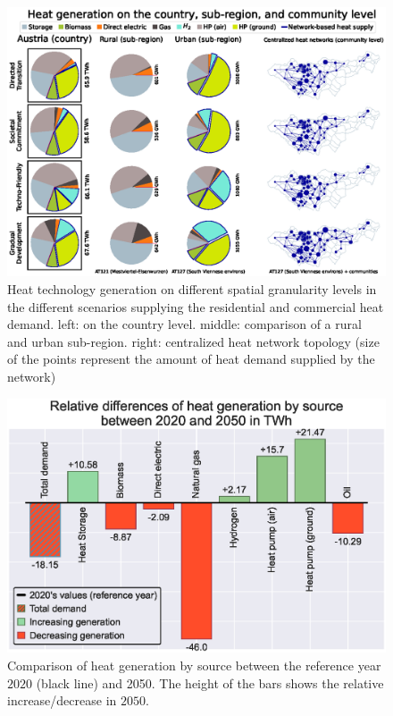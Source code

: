 \begin{figure}
	\centering
	\includegraphics[width=1\linewidth]{figures/4_Results/Fig_Matrix-plot/Spatial_results.eps}
	\caption{Heat technology generation on different spatial granularity levels in the different scenarios supplying the residential and commercial heat demand. left: on the country level. middle: comparison of a rural and urban sub-region. right: centralized heat network topology (size of the points represent the amount of heat demand supplied by the network)}
	\label{fig:res1}
\end{figure}

\begin{figure}
	\centering
	\includegraphics[width=1\linewidth]{figures/4_Results/Fig-Comp/Ref-2050.eps}
	\caption{Comparison of heat generation by source between the reference year $2020$ (black line) and 2050. The height of the bars shows the relative increase/decrease in $2050$.}
	\label{fig:res-comp}
\end{figure}

